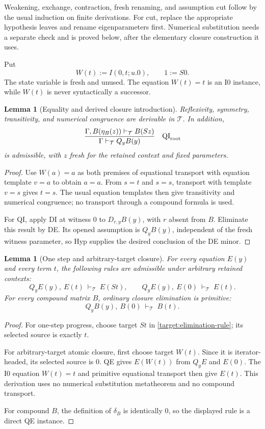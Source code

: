 \documentclass[11pt,a4paper]{article}
\newtheorem{lemma}[theorem]{Lemma}
\theoremstyle{definition}\newtheorem{definition}[theorem]{Definition}
\begin{document}
Weakening, exchange, contraction, fresh renaming, and assumption cut follow
by the usual induction on finite derivations.  For cut, replace the
appropriate hypothesis leaves and rename eigenparameters first.  Numerical
substitution needs a separate check and is proved below, after the elementary
closure construction it uses.

Put
\begin{equation}
 W(t):=I(0,t;u.0),\qquad 1:=S0.
 \label{target:wrapper}
\end{equation}
The state variable is fresh and unused.  The equation $W(t)=t$ is an I0
instance, while $W(t)$ is never syntactically a successor.

\begin{lemma}[Equality and derived closure introduction]
\label{target:eq-qi}
Reflexivity, symmetry, transitivity, and numerical congruence are derivable
in $\mathcal T$.  In addition,
\[
 \frac{\Gamma,B(\eta_B(z))\vdash_{\mathcal T}B(Sz)}
      {\Gamma\vdash_{\mathcal T}Q_yB(y)}
 \quad\mathrm{QI}_{\rm root}
\]
is admissible, with $z$ fresh for the retained context and fixed parameters.
\end{lemma}
\begin{proof}
Use $W(a)=a$ as both premises of equational transport with equation template
$v=a$ to obtain $a=a$.  From $s=t$ and $s=s$, transport with template
$v=s$ gives $t=s$.  The usual equation templates then give transitivity and
numerical congruence; no transport through a compound formula is used.

For QI, apply DI at witness $0$ to $D_{r,y}B(y)$, with $r$ absent from
$B$.  Eliminate this result by DE.  Its opened assumption is $Q_yB(y)$,
independent of the fresh witness parameter, so Hyp supplies the desired
conclusion of the DE minor.
\end{proof}

\begin{lemma}[One step and arbitrary-target closure]
\label{target:closure-interfaces}
For every equation $E(y)$ and every term $t$, the following rules are
admissible under arbitrary retained contexts:
\[
 Q_yE(y),\ E(t)\ \vdash_{\mathcal T}\ E(St),
 \qquad
 Q_yE(y),\ E(0)\ \vdash_{\mathcal T}\ E(t).
 \tag{Atomic interfaces}\label{target:atomic-interfaces}
\]
For every compound matrix $B$, ordinary closure elimination is primitive:
\[
 Q_yB(y),\ B(0)\ \vdash_{\mathcal T}\ B(t).
 \tag{Compound interface}\label{target:compound-interface}
\]
\end{lemma}
\begin{proof}
For one-step progress, choose target $St$ in
\eqref{target:elimination-rule}; its selected source is exactly $t$.

For arbitrary-target atomic closure, first choose target $W(t)$.  Since it
is iterator-headed, its selected source is $0$.  QE gives $E(W(t))$ from
$Q_yE$ and $E(0)$.  The I0 equation $W(t)=t$ and primitive equational
transport then give $E(t)$.  This derivation uses no numerical substitution
metatheorem and no compound transport.

For compound $B$, the definition of $\delta_B$ is identically $0$, so the
displayed rule is a direct QE instance.
\end{proof}
\end{document}
